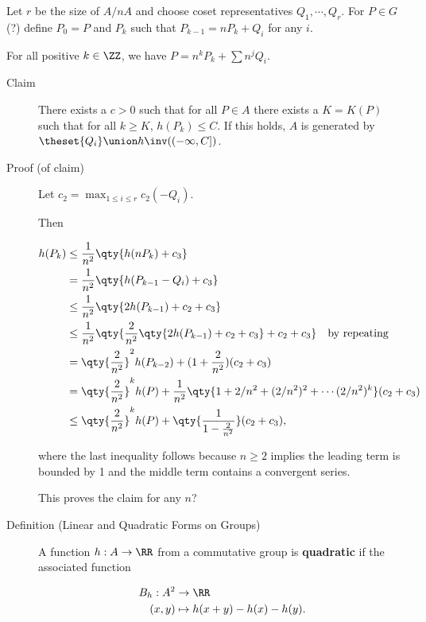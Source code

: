 \begin{description}
\tightlist
\item[Proof]
Let \(r\) be the size of \(A/nA\) and choose coset representatives
\(Q_1, \cdots, Q_r\). For \(P\in G\) (?) define \(P_0 = P\) and \(P_k\)
such that \(P_{k-1} = n P_k + Q_i\) for any \(i\).
\end{description}

For all positive \(k \in \ZZ\), we have \(P = n^k P_k + \sum n^j Q_i\).

\begin{description}
\item[Claim]
There exists a \(c> 0\) such that for all \(P \in A\) there exists a
\(K = K(P)\) such that for all \(k\geq K\), \(h(P_k) \leq C\). If this
holds, \(A\) is generated by
\(\theset{Q_i} \union h\inv((-\infty, C])\).
\item[Proof (of claim)]
Let \(c_2 = \max_{1\leq i \leq r} c_2(-Q_i)\).

Then

\begin{align*}
h(P_k) 
&\leq \frac 1 {n^2} \qty{ h(nP_k) + c_3  } \\
&= \frac 1 {n^2} \qty{ h(P_{k-1} - Q_i) + c_3  } \\
&\leq \frac 1 {n^2} \qty{ 2h(P_{k-1}) + c_2 + c_3  } \\
&\leq \frac 1 {n^2} \qty{ \frac 2 {n^2} \qty{ 2h(P_{k-1}) + c_2 + c_3  } + c_2 + c_3} \quad \text{by repeating} \\
&= \qty{ \frac{2}{n^2}  }^2 h(P_{k-2}) + (1 + \frac{2}{n^2})(c_2 + c_3) \\
&= \qty{\frac 2 {n^2}  }^k h(P) + \frac 1 {n^2} \qty{1 + 2/n^2 + (2/n^2)^2 + \cdots (2/n^2)^k   }(c_2 + c_3) \\
&\leq \qty{\frac{2}{n^2}  }^k h(P) + \qty{ \frac{1}{1 - \frac{2}{n^2}}  }(c_2 + c_3) 
,\end{align*}

where the last inequality follows because \(n \geq 2\) implies the
leading term is bounded by 1 and the middle term contains a convergent
series.

This proves the claim for any \(n\)?
\item[Definition (Linear and Quadratic Forms on Groups)]
A function \(h:A \to \RR\) from a commutative group is
\textbf{quadratic} if the associated function

\begin{align*}
B_h:A^2 &\to \RR \\
(x, y) &\mapsto h(x+y) - h(x) - h(y)
.\end{align*}


\end{description}
